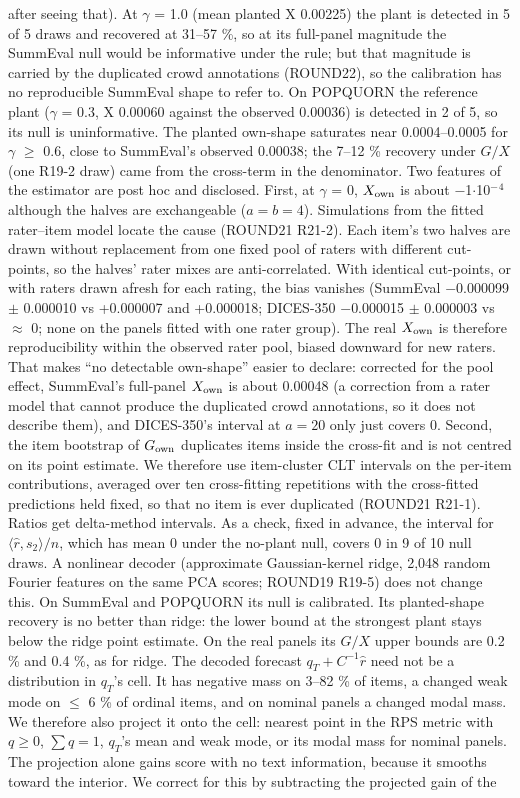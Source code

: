 \documentclass[10pt]{article}
\begin{document}
after seeing that). At $\gamma$ = 1.0 (mean planted X 0.00225) the plant is detected in 5 of 5 draws and recovered at 31--57 \%, so at its full-panel magnitude the SummEval null would be informative under the rule; but that magnitude is carried by the duplicated crowd annotations (ROUND22), so the calibration has no reproducible SummEval shape to refer to. On POPQUORN the reference plant ($\gamma$ = 0.3, X 0.00060 against the observed 0.00036) is detected in 2 of 5, so its null is uninformative. The planted own-shape saturates near 0.0004--0.0005 for $\gamma$ $\geq$ 0.6, close to SummEval's observed 0.00038; the 7--12 \% recovery under \(G/X\) (one R19-2 draw) came from the cross-term in the denominator. Two features of the estimator are post hoc and disclosed. First, at $\gamma$ = 0, \(X_{\rm own}\) is about $-$1$\cdot$10$^{-}$$^{4}$ although the halves are exchangeable (\(a=b=4\)). Simulations from the fitted rater--item model locate the cause (ROUND21 R21-2). Each item's two halves are drawn without replacement from one fixed pool of raters with different cut-points, so the halves' rater mixes are anti-correlated. With identical cut-points, or with raters drawn afresh for each rating, the bias vanishes (SummEval $-$0.000099 $\pm$ 0.000010 vs +0.000007 and +0.000018; DICES-350 $-$0.000015 $\pm$ 0.000003 vs $\approx$ 0; none on the panels fitted with one rater group). The real \(X_{\rm own}\) is therefore reproducibility within the observed rater pool, biased downward for new raters. That makes ``no detectable own-shape'' easier to declare: corrected for the pool effect, SummEval's full-panel \(X_{\rm own}\) is about 0.00048 (a correction from a rater model that cannot produce the duplicated crowd annotations, so it does not describe them), and DICES-350's interval at \(a=20\) only just covers 0. Second, the item bootstrap of \(G_{\rm own}\) duplicates items inside the cross-fit and is not centred on its point estimate. We therefore use item-cluster CLT intervals on the per-item contributions, averaged over ten cross-fitting repetitions with the cross-fitted predictions held fixed, so that no item is ever duplicated (ROUND21 R21-1). Ratios get delta-method intervals. As a check, fixed in advance, the interval for \(\langle\hat r,s_2\rangle/n\), which has mean 0 under the no-plant null, covers 0 in 9 of 10 null draws. A nonlinear decoder (approximate Gaussian-kernel ridge, 2,048 random Fourier features on the same PCA scores; ROUND19 R19-5) does not change this. On SummEval and POPQUORN its null is calibrated. Its planted-shape recovery is no better than ridge: the lower bound at the strongest plant stays below the ridge point estimate. On the real panels its \(G/X\) upper bounds are 0.2 \% and 0.4 \%, as for ridge. The decoded forecast \(q_T + C^{-1}\hat r\) need not be a distribution in \(q_T\)'s cell. It has negative mass on 3--82 \% of items, a changed weak mode on $\leq$ 6 \% of ordinal items, and on nominal panels a changed modal mass. We therefore also project it onto the cell: nearest point in the RPS metric with \(q\ge0\), \(\sum q=1\), \(q_T\)'s mean and weak mode, or its modal mass for nominal panels. The projection alone gains score with no text information, because it smooths toward the interior. We correct for this by subtracting the projected gain of the 
\end{document}
